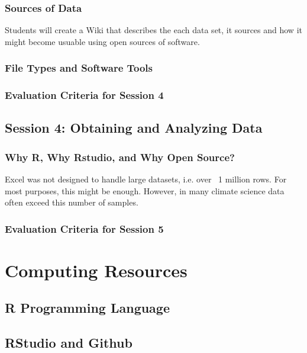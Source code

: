 \documentclass{article}\usepackage[]{graphicx}\usepackage[]{color}
\begin{document}
\subsubsection{Sources of Data}

Students will create a Wiki that describes the each data set, it sources and how it might become usuable using open sources of software.

\subsubsection{File Types and Software Tools}

\subsubsection{Evaluation Criteria for Session 4}


\subsection{Session 4: Obtaining and Analyzing Data}

\subsubsection{Why R, Why Rstudio, and Why Open Source?}

Excel was not designed to handle large datasets, i.e. over ~1 million rows. For most purposes, this might be enough. However, in many climate science data often exceed this number of samples.

\subsubsection{Evaluation Criteria for Session 5}



\section{Computing Resources}

\subsection{R Programming Language}

\subsection{RStudio and Github}
\end{document}
